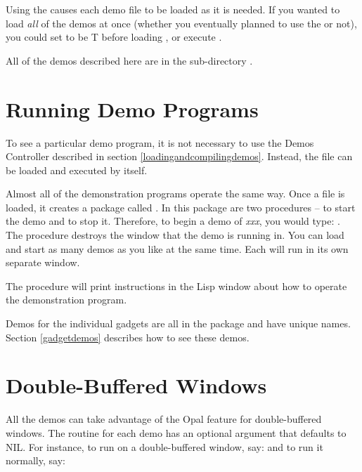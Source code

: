 Using the  causes each demo file to be loaded as it is
needed.  If you wanted to load {\it all} of the demos at once (whether you
eventually planned to use the  or not), you could set
 to be T before loading , or
execute .

All of the demos described here are in the sub-directory .

\section{Running Demo Programs}

To see a particular demo program, it is not necessary to use the Demos
Controller described in section \ref{loadingandcompilingdemos}.
Instead, the file can be loaded and executed by itself.

Almost all of the demonstration programs operate the same way.  Once a file
 is loaded, it creates a package called .
In this package are two procedures --  to start the demo and
 to stop it.  Therefore, to begin a demo of {\it xxx}, you would
type: .  The  procedure destroys the
window that the demo is running in.  You can load and start as many demos
as you like at the same time.  Each will run in its own separate window.

The  procedure will print instructions in the Lisp window about
how to operate the demonstration program.

Demos for the individual gadgets are all in the  package
and have unique names.  Section \ref{gadgetdemos} describes how to see
these demos.


\section{Double-Buffered Windows}

All the demos can take advantage of the Opal feature for double-buffered
windows.  The  routine for each demo has an optional
 argument that defaults to NIL.  For instance, to
run  on a double-buffered window, say:
and to run it normally, say:


